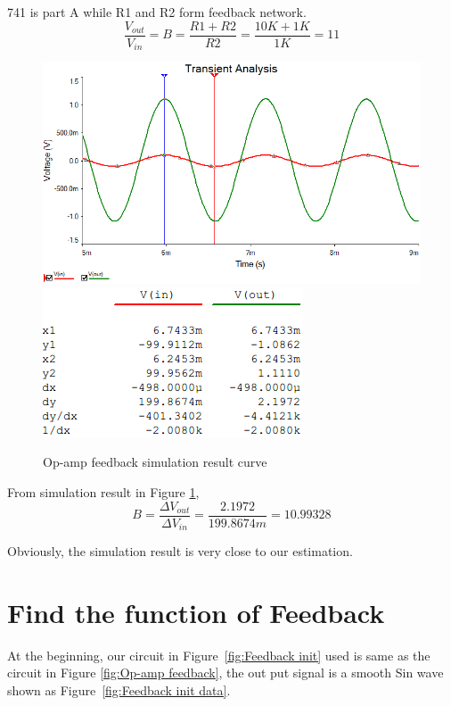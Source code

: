 741 is part A while R1 and R2 form feedback network. 
\[ \frac{V_{out}}{V_{in}} = B = \frac{R1 + R2}{R2} = \frac{10K + 1K}{1K} = 11 \]
 
\begin{figure}[htbp]
	\centering 
	\includegraphics[scale=0.6]{"../Photo/Chap2/Op-amp feedback simulation wave"}\\[0.5cm]
	\includegraphics[scale =1]{"../Photo/Chap2/Op-amp feedback simulation cursor data"}
	\caption{Op-amp  feedback simulation result curve}
	\label{fig:Op-amp  feedback simulation result }
\end{figure}

From simulation result in Figure \ref{fig:Op-amp  feedback simulation result }, 
\[ B = \frac{\Delta V_{out}}{\Delta V_{in}} =  \frac{2.1972}{199.8674m} =  10.99328 \]
 
Obviously, the simulation result is very close to our estimation.

\section{Find the function of Feedback }

At the beginning, our circuit in Figure~\ref{fig:Feedback init} used is same as the circuit in Figure \ref{fig:Op-amp feedback}, the out put signal is a smooth Sin wave shown as Figure~\ref{fig:Feedback init data}.

